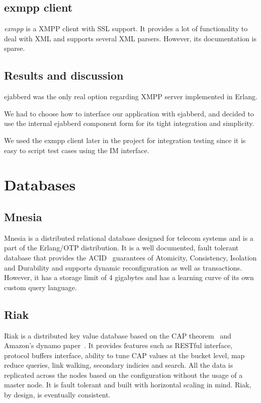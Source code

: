 \documentclass[11pt,a4paper]{report}
\begin{document}
\subsection{exmpp client}
\emph{exmpp} is a XMPP client with SSL support. It provides a lot of functionality to
deal with XML and supports several XML parsers. However, its documentation is
sparse.

\subsection{Results and discussion}
ejabberd was the only real option regarding XMPP server implemented in Erlang.

We had to choose how to interface our application with ejabberd, and decided
to use the internal ejabberd component form for its tight integration and
simplicity.

We used the exmpp client later in the project for integration
testing since it is easy to script test cases using the IM interface.

\section{Databases}
\subsection{Mnesia}
Mnesia is a distributed relational database designed for telecom systems and is
a part of the Erlang/OTP distribution. It is a well documented, fault tolerant
database that provides the ACID~\cite{ACID} guarantees of Atomicity, Consistency,
Isolation and Durability and supports dynamic reconfiguration as well
as transactions. However, it has a storage limit of 4 gigabytes and has a
learning curve of its own custom query language.

\subsection{Riak}
Riak is a distributed key value database based on the CAP
theorem~\cite{cap_theorem} and Amazon's dynamo paper~\cite{dynamo}. It provides
features such as RESTful interface, protocol buffers interface, ability to tune
CAP values at the bucket level, map reduce queries, link walking, secondary
indicies and search. All the data is replicated across the nodes based on the
configuration without the usage of a master node. It is fault tolerant and built
with horizontal scaling in mind. Riak, by design, is eventually consistent.
\end{document}

